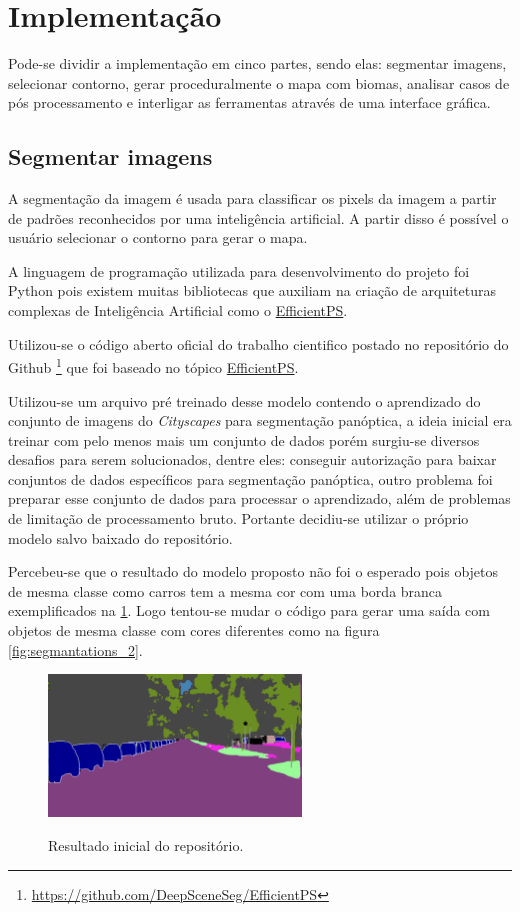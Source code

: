 \section{Implementação}

Pode-se dividir a implementação em cinco partes, sendo elas: segmentar imagens, selecionar contorno, gerar proceduralmente o mapa com biomas, analisar casos de pós processamento e interligar as ferramentas através de uma interface gráfica.

\subsection{Segmentar imagens}

A segmentação da imagem é usada para classificar os pixels da imagem a partir de padrões reconhecidos por uma inteligência artificial. A partir disso é possível o usuário selecionar o contorno para gerar o mapa.

A linguagem de programação utilizada para desenvolvimento do projeto foi Python pois existem muitas bibliotecas que auxiliam na criação de arquiteturas complexas de Inteligência Artificial como o \hyperref[sec:EfficientPS]{EfficientPS}.

Utilizou-se o código aberto oficial do trabalho cientifico postado no repositório do Github \footnote{\url{https://github.com/DeepSceneSeg/EfficientPS}} que foi baseado no tópico \hyperref[sec:EfficientPS]{EfficientPS}.

Utilizou-se um arquivo pré treinado desse modelo contendo o aprendizado do conjunto de imagens do \textit{Cityscapes} para segmentação panóptica, a ideia inicial era treinar com pelo menos mais um conjunto de dados porém surgiu-se diversos desafios para serem solucionados, dentre eles: conseguir autorização para baixar conjuntos de dados específicos para segmentação panóptica, outro problema foi preparar esse conjunto de dados para processar o aprendizado, além de problemas de limitação de processamento bruto. Portante decidiu-se utilizar o próprio modelo salvo baixado do repositório.

Percebeu-se que o resultado do modelo proposto não foi o esperado pois objetos de mesma classe como carros tem a mesma cor com uma borda branca exemplificados na \cref{fig:resultado_inicial}. Logo tentou-se mudar o código para gerar uma saída com objetos de mesma classe com cores diferentes como na figura \cref{fig:segmantations_2}.

\begin{figure}[!ht]
	\centering
    \caption{Resultado inicial do repositório.}
	\includegraphics[width=0.6\textwidth]{figures/resultado_primario.png}
	\label{fig:resultado_inicial}
\end{figure}

